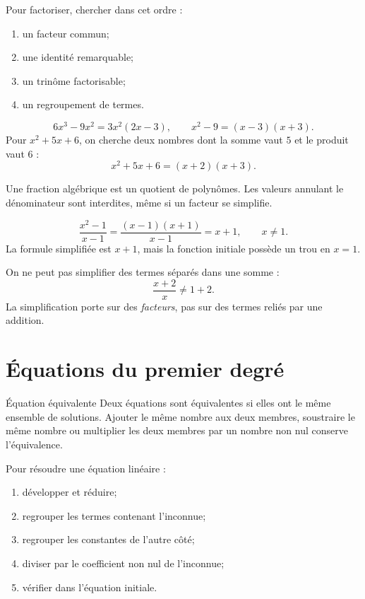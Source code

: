 \documentclass[12pt,a4paper,openany]{book}
\begin{document}
\begin{methodbox}
Pour factoriser, chercher dans cet ordre :
\begin{enumerate}
\item un facteur commun;
\item une identité remarquable;
\item un trinôme factorisable;
\item un regroupement de termes.
\end{enumerate}
\end{methodbox}

\begin{examplebox}
\[
6x^3-9x^2=3x^2(2x-3),
\qquad
x^2-9=(x-3)(x+3).
\]
Pour $x^2+5x+6$, on cherche deux nombres dont la somme vaut $5$ et le produit vaut $6$ :
\[
x^2+5x+6=(x+2)(x+3).
\]
\end{examplebox}

Une fraction algébrique est un quotient de polynômes. Les valeurs annulant le dénominateur sont interdites, même si un facteur se simplifie.

\begin{examplebox}
\[
\frac{x^2-1}{x-1}=\frac{(x-1)(x+1)}{x-1}=x+1,
\qquad x\neq1.
\]
La formule simplifiée est $x+1$, mais la fonction initiale possède un trou en $x=1$.
\end{examplebox}

\begin{counterbox}
On ne peut pas simplifier des termes séparés dans une somme :
\[
\frac{x+2}{x}\neq 1+2.
\]
La simplification porte sur des \emph{facteurs}, pas sur des termes reliés par une addition.
\end{counterbox}

\section{Équations du premier degré}

\begin{definition}{Équation équivalente}{}
Deux équations sont équivalentes si elles ont le même ensemble de solutions. Ajouter le même nombre aux deux membres, soustraire le même nombre ou multiplier les deux membres par un nombre non nul conserve l'équivalence.
\end{definition}

\begin{methodbox}
Pour résoudre une équation linéaire :
\begin{enumerate}
\item développer et réduire;
\item regrouper les termes contenant l'inconnue;
\item regrouper les constantes de l'autre côté;
\item diviser par le coefficient non nul de l'inconnue;
\item vérifier dans l'équation initiale.
\end{enumerate}
\end{methodbox}
\end{document}
